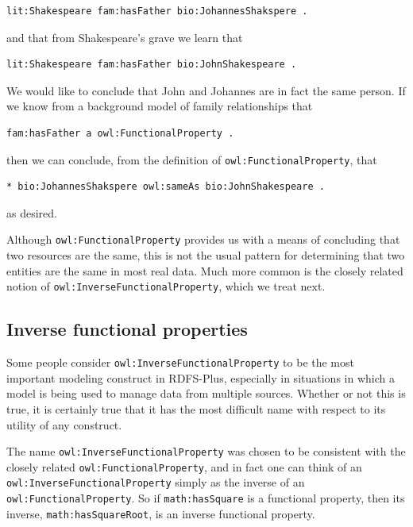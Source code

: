 \begin{lstlisting}
lit:Shakespeare fam:hasFather bio:JohannesShakspere .
\end{lstlisting}

and that from Shakespeare's grave we learn that

\begin{lstlisting}
lit:Shakespeare fam:hasFather bio:JohnShakespeare .
\end{lstlisting}

We would like to conclude that John and Johannes are in fact the same
person. If we know from a background model of family relationships that

\begin{lstlisting}
fam:hasFather a owl:FunctionalProperty .
\end{lstlisting}

then we can conclude, from the definition of \texttt{owl:FunctionalProperty},
that

\begin{lstlisting}
* bio:JohannesShakspere owl:sameAs bio:JohnShakespeare .
\end{lstlisting}

as desired.

Although \texttt{owl:FunctionalProperty} provides us with a means of concluding
that two resources are the same, this is not the usual pattern for
determining that two entities are the same in most real data. Much more
common is the closely related notion of \texttt{owl:InverseFunctionalProperty},
which we treat next.

\subsection{Inverse functional properties}

Some people consider \texttt{owl:InverseFunctionalProperty} to be the most
important modeling construct in RDFS-Plus, especially in situations in
which a model is being used to manage data from multiple sources.
Whether or not this is true, it is certainly true that it has the most
difficult name with respect to its utility of any construct.

The name \texttt{owl:InverseFunctionalProperty} was chosen to be consistent with
the closely related \texttt{owl:FunctionalProperty}, and in fact one can think of
an \texttt{owl:InverseFunctionalProperty} simply as the inverse of an
\texttt{owl:FunctionalProperty}. So if \texttt{math:hasSquare} is a functional property,
then its inverse, \texttt{math:hasSquareRoot}, is an inverse functional
property.

